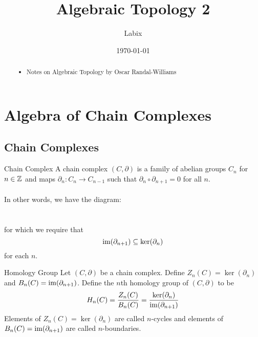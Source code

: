 \documentclass[a4paper]{article}
\title{Algebraic Topology 2}
\author{Labix}
\date{\today}
\begin{document}
\maketitle
\begin{abstract}
\begin{itemize}
\item Notes on Algebraic Topology by Oscar Randal-Williams
\end{itemize}
\end{abstract}
\pagebreak
\tableofcontents

\pagebreak
\section{Algebra of Chain Complexes}
\subsection{Chain Complexes}
\begin{defn}{Chain Complex}{} A chain complex $(C,\partial)$ is a family of abelian groups $C_n$ for $n\in\mathbb{Z}$ and maps $\partial_n:C_n\to C_{n-1}$ such that $\partial_n\circ\partial_{n+1}=0$ for all $n$. \\~\\
In other words, we have the diagram: \\
\\~\\
for which we require that $$\operatorname{im}(\partial_{n+1})\subseteq\ker(\partial_n)$$ for each $n$. 
\end{defn}

\begin{defn}{Homology Group}{} Let $(C,\partial)$ be a chain complex. Define $Z_n(C)=\ker(\partial_n)$ and $B_n(C)=\operatorname{im}(\partial_{n+1})$. Define the $n$th homology group of $(C,\partial)$ to be $$H_n(C)=\frac{Z_n(C)}{B_n(C)}=\frac{\ker(\partial_n)}{\operatorname{im}(\partial_{n+1})}$$
Elements of $Z_n(C)=\ker(\partial_n)$ are called $n$-cycles and elements of $B_n(C)=\operatorname{im}(\partial_{n+1})$ are called $n$-boundaries. 
\end{defn}
\end{document}
